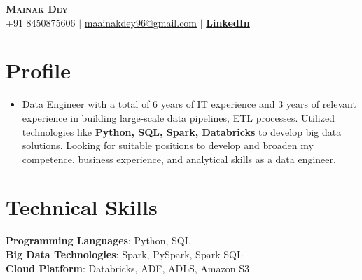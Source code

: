 \documentclass[letterpaper,11pt]{article}
\begin{document}


\begin{center}
    \textbf{\Huge \scshape Mainak Dey} \\ \vspace{1pt}
    \small +91 8450875606 
    $|$ \href{mailto:maainakdey96@gmail.com}{{maainakdey96@gmail.com}}  
    $|$  
    \href{https://www.linkedin.com/in/mainak-dey-64646013a/}{\bf LinkedIn}
    
\end{center}



\section{Profile}
\begin{itemize}[leftmargin=0.15in, label={}]
\item 
Data Engineer with a total of 6 years of IT experience and 3 years of relevant experience in building large-scale data pipelines, ETL processes. Utilized technologies like \textbf{Python, SQL, Spark, Databricks} to develop big data solutions. Looking for suitable positions to develop and broaden my competence, business experience, and analytical skills as a data engineer.
\end{itemize}

\section{Technical Skills}
 \begin{itemize}[leftmargin=0.15in, label={}]
    \small{\item{
     \textbf{Programming Languages}{:\hspace{0.06cm} Python, SQL} \\
     \textbf{Big Data Technologies}{:\hspace{0.49cm} Spark, PySpark, Spark SQL } \\
     \textbf{Cloud Platform}{:\hspace{1.70cm} Databricks, ADF,  ADLS, Amazon S3} \\
     
    }}
 \end{itemize}
\end{document}
